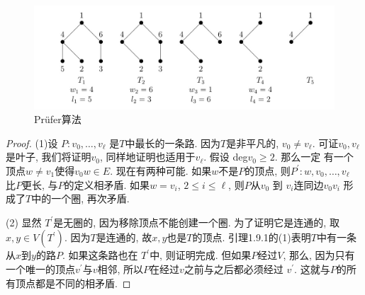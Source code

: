 \documentclass{ctexbook}
\begin{document}
\begin{figure}
    \centering
    \includegraphics[scale=0.3]{./fig1/figure1.10.PNG}
    \caption{Prüfer算法}
\end{figure}
    \begin{proof}
   	(1)设 $P: v_{0}, \ldots, v_{\ell}$ 是$T$中最长的一条路. 因为$T$是非平凡的, $v_{0} \neq v_{\ell}$.
   	可证$v_{0}, v_{\ell}$是叶子, 我们将证明$v_{0}$, 同样地证明也适用于$v_{\ell}$. 假设 deg$v_{0} \geqslant 2$. 那么一定
   	有一个顶点$w \neq v_{1}$使得$v_{0} w \in E$. 现在有两种可能. 如果$w$不是$P$的顶点, 则$P^{\prime}: w, v_{0}, \ldots, v_{\ell}$
   	比$P$更长, 与$P$的定义相矛盾. 如果$w=v_{i}$, $2 \leqslant i \leqslant \ell$, 则$P$从$v_{0}$ 到 $v_{i}$连同边$v_{0} v_{i}$
   	形成了$T$中的一个圈, 再次矛盾.

   	(2) 显然 $T^{\prime}$是无圈的, 因为移除顶点不能创建一个圈. 为了证明它是连通的, 取$x, y \in V\left(T^{\prime}\right)$.
   	因为$T$是连通的, 故$x, y$也是$T$的顶点. 引理1.9.1的(1)表明$T$中有一条从$x$到$y$的路$P$. 如果这条路也在 $T^{\prime}$中,
   	则证明完成. 但如果$P$经过$V$, 那么, 因为只有一个唯一的顶点$v^{\prime}$与$v$相邻, 所以$P$在经过$v$之前与之后都必须经过
   	$v^{\prime}$. 这就与$P$的所有顶点都是不同的相矛盾.
   \end{proof}
\end{document}
